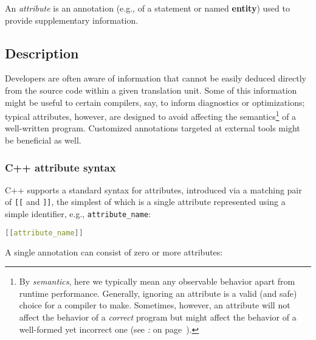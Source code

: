 

An \emph{attribute} is an annotation (e.g., of a statement or named
\textbf{entity}) used to provide supplementary information.

\subsection[Description]{Description}\label{description}

Developers are often aware of information that cannot be easily deduced directly
from the source code within a given translation unit. Some of this
information might be useful to certain compilers, say, to inform
diagnostics or optimizations; typical attributes, however, are designed
to avoid affecting the semantics{\cprotect\footnote{By \emph{semantics}, here
we typically mean any observable behavior apart from runtime
performance. Generally, ignoring an attribute is a valid (and safe)
choice for a compiler to make. Sometimes, however, an
attribute will not affect the behavior of a \emph{correct} program but might affect the behavior of a well-formed yet incorrect one (see
  {\it{}:} {\it{}} on page~\pageref{delineating-explicit-assumptions-in-code-to-achieve-better-optimizations}).}} of a
well-written program. Customized annotations targeted at external tools
might be beneficial as well.

\subsubsection[C++ attribute syntax]{C++ attribute syntax}\label{c++-attribute-syntax}

C++ supports a standard syntax for attributes, introduced via a matching
pair of \texttt{[[} and \texttt{]]}, the simplest of which is a single
attribute represented using a simple identifier, e.g.,
\texttt{attribute\_name}:

\begin{lstlisting}[language=C++]
[[attribute_name]]
\end{lstlisting}

\noindent A single annotation can consist of zero or more attributes:

